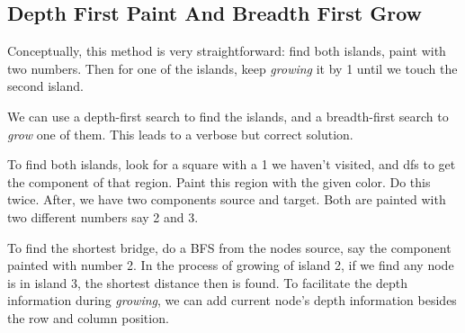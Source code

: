 \documentclass[a4paper,12pt]{article}
\begin{document}
\subsection{Depth First Paint And Breadth First Grow}
Conceptually, this method is very straightforward: find both islands, paint with two numbers. Then for one of the islands, keep \textit{growing} it by 1 until we touch the second island.
\par
We can use a depth-first search to find the islands, and a breadth-first search to \textit{grow} one of them. This leads to a verbose but correct solution.
\par
To find both islands, look for a square with a 1 we haven't visited, and dfs to get the component of that region. Paint this region with the given color. Do this twice. After, we have two components source and target. Both are painted with two different numbers say 2 and 3.
\par
To find the shortest bridge, do a BFS from the nodes source, say the component painted with number 2. In the process of growing of island 2, if we find any node is in island 3, the shortest distance then is found. To facilitate the depth information during \textit{growing}, we can add current node's depth information besides the row and column position.
\end{document}
